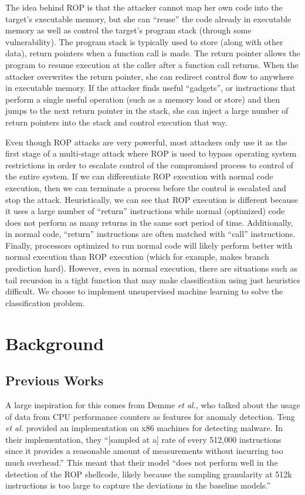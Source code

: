 \documentclass[letterpaper,twocolumn,10pt]{article}
\begin{document}
The idea behind ROP is that the attacker cannot map her own code into the target's 
executable memory, but she can ``reuse'' the code already in executable memory as 
well as control the target's program stack (through some vulnerability). The 
program stack is typically used to store (along with other data), return pointers 
when a function call is made. The return pointer allows the program to resume 
execution at the caller after a function call returns. When the attacker overwrites 
the return pointer, she can redirect control flow to anywhere in executable 
memory. If the attacker finds useful ``gadgets'', or instructions that perform a 
single useful operation (such as a memory load or store) and then jumps to the 
next return pointer in the stack, she can inject a large number of return 
pointers into the stack and control execution that way.

Even though ROP attacks are very powerful\cite{unk}, most attackers only use it 
as the first stage of a multi-stage attack where ROP is used to bypass operating 
system restrictions in order to escalate control of the compromised process to 
control of the entire system. If we can differentiate ROP execution with normal 
code execution, then we can terminate a process before the control is escalated 
and stop the attack. Heuristically, we can see that ROP execution is different 
because it uses a large number of ``return'' instructions while normal (optimized) 
code does not perform as many returns in the same sort period of time. Additionally, 
in normal code, ``return'' 
instructions are often matched with ``call'' instructions. Finally, processors optimized 
to run normal code will likely perform better with normal execution than ROP 
execution (which for example, makes branch prediction hard). However, even in 
normal execution, there are situations such as tail recursion in a tight function 
that may make classification using just heuristics difficult. We choose to 
implement unsupervised machine learning to solve the classification problem.

\section{Background}

\subsection*{Previous Works}

A large inspiration for this comes from Demme \textit{et al.}, 
who talked about the usage of data from CPU performance counters as features for 
anomaly detection\cite{Demme:2013:FOM:2508148.2485970}. Teng \textit{et al.} provided 
an implementation on x86 machines for detecting malware\cite{DBLP:journals/corr/TangSS14}. In their implementation, 
they ``[sampled at a] rate of every 512,000 instructions since it provides a reasonable amount of measurements without incurring too much overhead.'' This meant that their model ``does not perform well in the detection of the ROP shellcode, likely because the sampling granularity at 512k instructions is too large to capture the deviations in the baseline models.''
\end{document}

